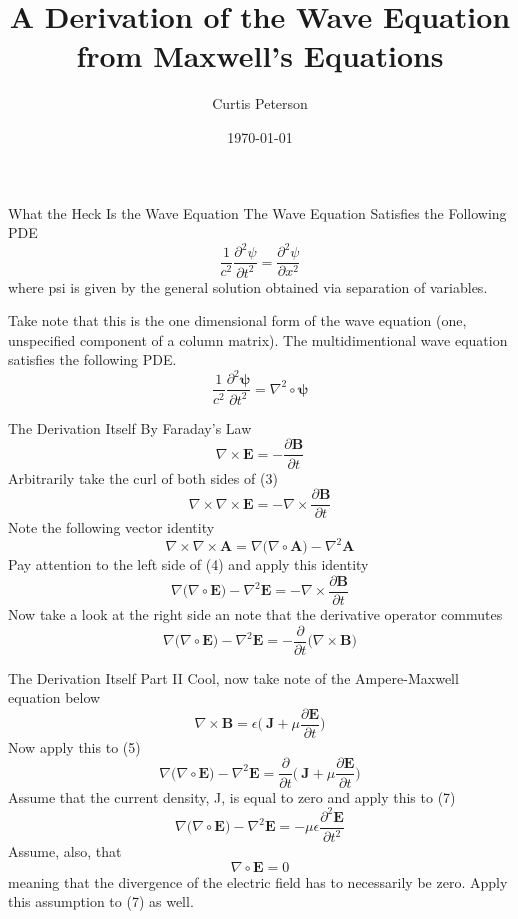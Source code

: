 \documentclass{beamer}
\title[Maxwell's Equations and the Wave Equation]{A Derivation of the Wave Equation from Maxwell's Equations}
\author{Curtis Peterson}
\institute{Arizona State University}
\date{\today}
\begin{document}
\begin{frame}
  \titlepage
\end{frame}
\begin{frame}{What the Heck Is the Wave Equation}
The Wave Equation Satisfies the Following PDE
\begin{equation}
\frac{1}{c^2}\frac{\partial^2\psi}{\partial t^2}=\frac{\partial^2\psi}{\partial x^2}
\end{equation}
where psi is given by the general solution obtained via separation of variables. 




Take note that this is the one dimensional form of the wave equation (one, unspecified component of a column matrix). The multidimentional wave equation satisfies the following PDE.
\begin{equation}
\frac{1}{c^2}\frac{\partial^2\mathbf{\psi}}{\partial t^2} = \nabla^2 \circ \mathbf{\psi}
\end{equation}
\end{frame}
\begin{frame}{The Derivation Itself}
By Faraday's Law
\begin{equation}
\nabla \times \textbf{E}=- \frac{\partial \textbf{B}}{\partial t}
\end{equation}
Arbitrarily take the curl of both sides of (3)
\begin{equation}
\nabla \times \nabla \times \textbf{E} =- \nabla \times \frac{\partial \textbf{B}}{\partial t}
\end{equation}
Note the following vector identity
$$\nabla \times \nabla \times \textbf{A} = \nabla \big( \nabla \circ \textbf{A} \big) - \nabla^2 \textbf{A}$$
Pay attention to the left side of (4) and apply this identity
$$\nabla \big( \nabla \circ \textbf{E} \big) - \nabla^2 \textbf{E} =- \nabla \times \frac{\partial \textbf{B}}{\partial t}$$
Now take a look at the right side an note that the derivative operator commutes
\begin{equation}
\nabla \big( \nabla \circ \textbf{E} \big) - \nabla^2 \textbf{E} =- \frac{\partial}{\partial t} \big( \nabla \times \textbf{B} \big)
\end{equation}
\end{frame}
\begin{frame}{The Derivation Itself Part II}
Cool, now take note of the Ampere-Maxwell equation below
\begin{equation}
\nabla \times \textbf{B} = \epsilon \big( \ \textbf{J} + \mu \frac{\partial \textbf{E}}{\partial t} \big)
\end{equation}
Now apply this to (5)
\begin{equation}
\nabla \big( \nabla \circ \textbf{E} \big) - \nabla^2 \textbf{E} = \frac{\partial}{\partial t} \big( \ \textbf{J} + \mu \frac{\partial \textbf{E}}{\partial t} \big) 
\end{equation}
Assume that the current density, J, is equal to zero and apply this to (7)
$$\nabla \big( \nabla \circ \textbf{E} \big) - \nabla^2 \textbf{E} =- \mu \epsilon \frac{\partial^2 \textbf{E}}{\partial t^2}$$
Assume, also, that 
$$\nabla \circ \textbf{E} = 0$$
meaning that the divergence of the electric field has to necessarily be zero. Apply this assumption to (7) as well.
\end{frame}
\end{document}
